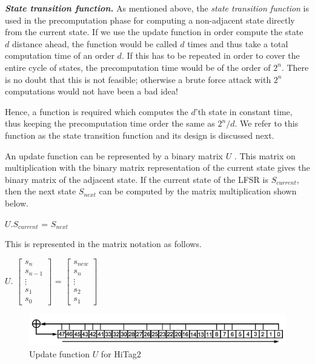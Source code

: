 \noindent \textit{\textbf{State transition function.}} As mentioned above, the \emph{state transition function} is used in the precomputation phase for computing a non-adjacent state directly from the current state. If we use the update function in order compute the state $d$ distance ahead, the function would be called $d$ times and thus take a total computation time of an order $d$. If this has to be repeated in order to cover the entire cycle of states, the precomputation time would be of the order of $2^n$. There is no doubt that this is not feasible; otherwise a brute force attack with $2^n$ computations would not have been a bad idea! 

Hence, a function is required which computes the $d$'th state in constant time, thus keeping the precomputation time order the same as $2^{n}/d$. We refer to this function as the state transition function and its design is discussed next. 

An update function can be represented by a binary matrix $U$ \cite{trappe2005icc}\cite{erik-discussions}. This matrix on multiplication with the binary matrix representation of the current state gives the binary matrix of the adjacent state. If the current state of the LFSR is $S_{current}$, then the next state $S_{next}$ can be computed by the matrix multiplication shown below.
\begin{center}
$U . S_{current}$ = $S_{next}$\\
\end{center}
This is represented in the matrix notation as follows.
\begin{center}
$U.$
$\begin{bmatrix}
s_{n} \\
s_{n-1} \\
\vdots \\
s_{1} \\
s_{0}
\end{bmatrix}$ = 
$\begin{bmatrix}
s_{new} \\
s_{n} \\
\vdots \\
s_{2} \\
s_{1}
\end{bmatrix}$
\end{center}

\begin{figure}[h!]
	\centering
	\includegraphics[width=5in]{./figures/hitag2-update-function.png}
	\caption{Update function $U$ for HiTag2}	
	\label{fig:hitag2-update-function}
\end{figure}

